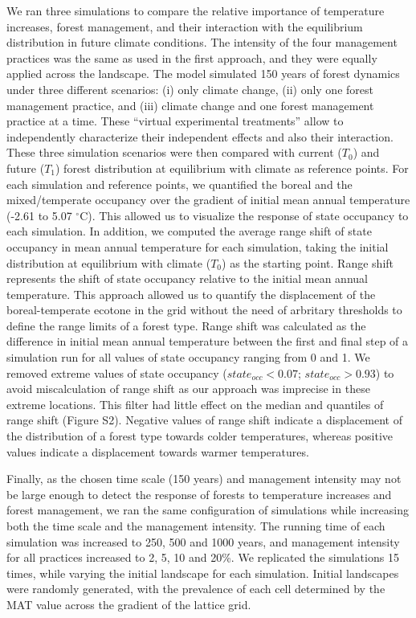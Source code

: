 We ran three simulations to compare the relative importance of
temperature increases, forest management, and their interaction with the
equilibrium distribution in future climate conditions. The intensity of
the four management practices was the same as used in the first
approach, and they were equally applied across the landscape. The model
simulated 150 years of forest dynamics under three different scenarios:
(i) only climate change, (ii) only one forest management practice, and
(iii) climate change and one forest management practice at a time. These
``virtual experimental treatments'' allow to independently characterize
their independent effects and also their interaction. These three
simulation scenarios were then compared with current (\(T_0\)) and
future (\(T_1\)) forest distribution at equilibrium with climate as
reference points. For each simulation and reference points, we
quantified the boreal and the mixed/temperate occupancy over the
gradient of initial mean annual temperature (-2.61 to 5.07
\(^{\circ}\)C). This allowed us to visualize the response of state
occupancy to each simulation. In addition, we computed the average range
shift of state occupancy in mean annual temperature for each simulation,
taking the initial distribution at equilibrium with climate (\(T_0\)) as
the starting point. Range shift represents the shift of state occupancy
relative to the initial mean annual temperature. This approach allowed
us to quantify the displacement of the boreal-temperate ecotone in the
grid without the need of arbritary thresholds to define the range limits
of a forest type. Range shift was calculated as the difference in
initial mean annual temperature between the first and final step of a
simulation run for all values of state occupancy ranging from 0 and 1.
We removed extreme values of state occupancy (\(state_{occ} < 0.07\);
\(state_{occ} > 0.93\)) to avoid miscalculation of range shift as our
approach was imprecise in these extreme locations. This filter had
little effect on the median and quantiles of range shift (Figure S2).
Negative values of range shift indicate a displacement of the
distribution of a forest type towards colder temperatures, whereas
positive values indicate a displacement towards warmer temperatures.

Finally, as the chosen time scale (150 years) and management intensity
may not be large enough to detect the response of forests to temperature
increases and forest management, we ran the same configuration of
simulations while increasing both the time scale and the management
intensity. The running time of each simulation was increased to 250, 500
and 1000 years, and management intensity for all practices increased to
2, 5, 10 and 20\%. We replicated the simulations 15 times, while varying
the initial landscape for each simulation. Initial landscapes were
randomly generated, with the prevalence of each cell determined by the
MAT value across the gradient of the lattice grid.

